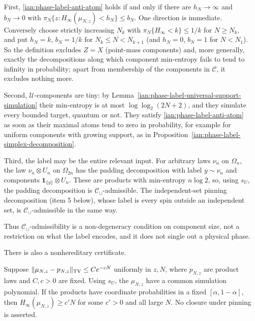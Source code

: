 \begin{remark}
\label{ian:phase-label-what-admissibility-excludes}
First, \eqref{ian:phase-label-anti-atom} holds if and only if there are
\(h_N\to\infty\) and \(b_N\to0\) with
\(\pi_N\{z:H_\infty(\mu_{N,z})<h_N\}\le b_N\). One direction is
immediate. Conversely choose strictly increasing \(N_k\) with
\(\pi_N\{H_\infty<k\}\le1/k\) for \(N\ge N_k\), and put \(h_N=k\),
\(b_N=1/k\) for \(N_k\le N<N_{k+1}\) (and \(h_N=0\), \(b_N=1\) for
\(N<N_1\)). So the definition excludes \(Z=X\)
(point-mass components) and, more generally, exactly the decompositions
along which component min-entropy fails to tend to infinity in
probability; apart from membership of the components in
\(\mathcal C\), it excludes nothing more.

Second, \(\mathcal U\)-components are tiny: by
Lemma~\ref{ian:phase-label-universal-support-simulation} their
min-entropy is at most \(\log\log_2(2N+2)\), and they simulate every
bounded target, quantum or not. They satisfy
\eqref{ian:phase-label-anti-atom} as soon as their maximal atoms tend to
zero in probability, for example for uniform components with growing
support, as in Proposition~\ref{ian:phase-label-simplex-decomposition}.

Third, the label may be the entire relevant input. For arbitrary laws
\(\nu_n\) on \(\Omega_n\), the law \(\nu_n\otimes U_n\) on \(\Omega_{2n}\)
has the padding decomposition with label \(y\sim\nu_n\) and components
\(\mathbf 1_{\{y\}}\otimes U_n\). These are products with min-entropy
\(n\log2\), so, using \(s_U\), the padding decomposition is
\(\mathcal C_\cup\)-admissible. The independent-set pinning
decomposition (item 5 below), whose label is every spin outside an
independent set, is \(\mathcal C_\cup\)-admissible in the same way.

Thus \(\mathcal C_\cup\)-admissibility is a non-degeneracy condition on
component size, not a restriction on what the label encodes, and it does
not single out a physical phase.
\end{remark}

There is also a nonhereditary certificate.

\begin{lemma}
\label{ian:phase-label-close-products}
Suppose \(\|\mu_{N,z}-p_{N,z}\|_{\rm TV}\le Ce^{-cN}\) uniformly in
\(z,N\), where \(p_{N,z}\) are product laws and \(C,c>0\) are fixed.
Using \(s_U\), the \(\mu_{N,z}\) have a common simulation
polynomial. If the products have coordinate probabilities in a fixed
\([\alpha,1-\alpha]\), then \(H_\infty(\mu_{N,z})\ge c'N\) for some
\(c'>0\) and all large \(N\). No closure under pinning is asserted.
\end{lemma}

